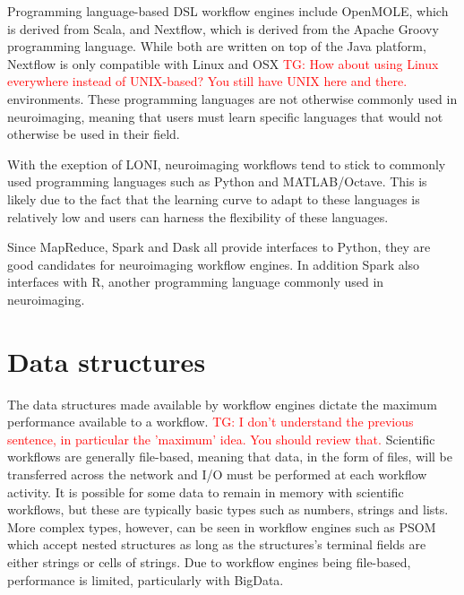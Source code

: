 \documentclass{report}
\newcommand{\tristan}[1]{\textcolor{red}{TG: #1}}
\begin{document}
            Programming language-based DSL workflow engines include OpenMOLE, which is  
            derived from Scala, and Nextflow, which is derived from the Apache 
            Groovy programming language. While both are written on top of the 
            Java platform, Nextflow is only compatible with Linux and OSX \tristan{How about using Linux everywhere instead of UNIX-based? You still have UNIX here and there.} 
            environments. These programming languages are not otherwise commonly
            used in neuroimaging, meaning that users must learn specific 
            languages that would not otherwise be used in their field.

            With the exeption of LONI, neuroimaging workflows tend to stick to
            commonly used programming languages such as Python and MATLAB/Octave.
            This is likely due to the fact that the learning curve to adapt to
            these languages is relatively low and users can harness the 
            flexibility of these languages. 
            
            Since MapReduce, Spark and Dask all provide interfaces to Python,  
            they are good candidates for neuroimaging workflow engines. In addition
            Spark also interfaces with R, another programming language commonly
            used in neuroimaging.

            \section{Data structures}
                
                The data structures made available by workflow engines dictate
                the maximum performance available to a workflow. \tristan{I don't understand the previous sentence, 
                in particular the 'maximum' idea. You should review that.} Scientific
                workflows are generally file-based, meaning that data, in the 
                form of files, will be 
                transferred across the network and I/O must be
                performed at each workflow activity. It is possible for some 
                data to remain in memory with scientific workflows, but these 
                are typically basic types such as numbers, strings and lists.
                More complex types, however, can be seen in workflow engines 
                such as PSOM which accept nested structures as long as the
                structures's terminal fields are either strings or cells of 
                strings. Due to workflow engines being file-based, performance
                is limited, particularly with BigData.
                
\end{document}
